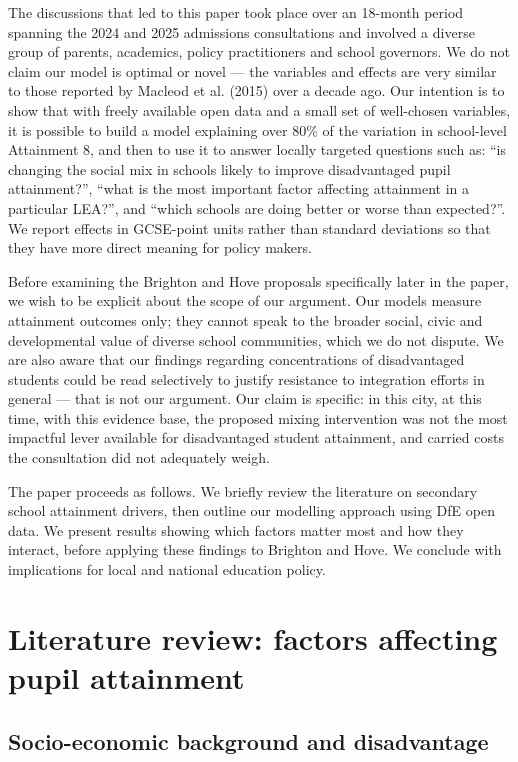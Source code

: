 \documentclass[
  12pt,
  titlepage]{article}
\begin{document}
The discussions that led to this paper took place over an 18-month
period spanning the 2024 and 2025 admissions consultations and involved
a diverse group of parents, academics, policy practitioners and school
governors. We do not claim our model is optimal or novel --- the
variables and effects are very similar to those reported by Macleod et
al. (2015) over a decade ago. Our intention is to show that with freely
available open data and a small set of well-chosen variables, it is
possible to build a model explaining over 80\% of the variation in
school-level Attainment 8, and then to use it to answer locally targeted
questions such as: ``is changing the social mix in schools likely to
improve disadvantaged pupil attainment?'', ``what is the most important
factor affecting attainment in a particular LEA?'', and ``which schools
are doing better or worse than expected?''. We report effects in
GCSE-point units rather than standard deviations so that they have more
direct meaning for policy makers.

Before examining the Brighton and Hove proposals specifically later in
the paper, we wish to be explicit about the scope of our argument. Our
models measure attainment outcomes only; they cannot speak to the
broader social, civic and developmental value of diverse school
communities, which we do not dispute. We are also aware that our
findings regarding concentrations of disadvantaged students could be
read selectively to justify resistance to integration efforts in general
--- that is not our argument. Our claim is specific: in this city, at
this time, with this evidence base, the proposed mixing intervention was
not the most impactful lever available for disadvantaged student
attainment, and carried costs the consultation did not adequately weigh.

The paper proceeds as follows. We briefly review the literature on
secondary school attainment drivers, then outline our modelling approach
using DfE open data. We present results showing which factors matter
most and how they interact, before applying these findings to Brighton
and Hove. We conclude with implications for local and national education
policy.

\section{Literature review: factors affecting pupil
attainment}\label{literature-review-factors-affecting-pupil-attainment}

\subsection{Socio-economic background and
disadvantage}\label{socio-economic-background-and-disadvantage}
\end{document}
